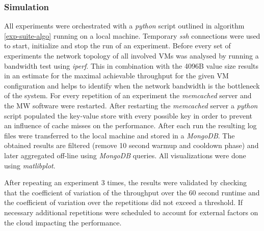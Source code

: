 \documentclass[report.tex]{subfiles}
\begin{document}
\subsubsection{Simulation}\label{simulation}

All experiments were orchestrated with a \emph{python} script outlined in algorithm \ref{exp-suite-algo} running on a local machine. Temporary \emph{ssh} connections were used to start, initialize and stop the run of an experiment. 
Before every set of experiments the network topology of all involved VMs was analysed by running a bandwidth test using \emph{iperf}. This in combination with the 4096B value size results in an estimate for the maximal achievable throughput for the given VM configuration and helps to identify when the network bandwidth is the bottleneck of the system.
For every repetition of an experiment the \emph{memcached} server and the MW software were restarted. After restarting the \emph{memcached} server a \emph{python} script populated the key-value store with every possible key in order to prevent an influence of cache misses on the performance. 
After each run  the resulting log files were transferred to the local machine and stored in a \emph{MongoDB}.
The obtained results are filtered (remove 10 second warmup and cooldown phase) and later aggregated off-line using \emph{MongoDB} queries.
All visualizations were done using \emph{matlibplot}.

After repeating an experiment 3 times, the results were validated by checking that the coefficient of variation of the throughput over the 60 second runtime and the coefficient of variation over the repetitions did not exceed a threshold. If necessary additional repetitions were scheduled to account for external factors on the cloud impacting the performance.
\end{document}
